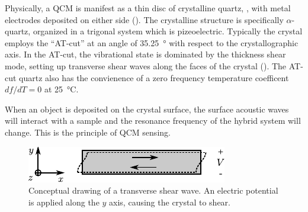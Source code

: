 Physically, a QCM is manifest as a thin disc of crystalline quartz,
, with metal electrodes deposited on either side
().  The crystalline structure is specifically
$\alpha$-quartz, organized in a trigonal system which is pizeoelectric.
Typically the crystal employs the ``AT-cut'' at an angle of
\SI{35.25}{\degree} with respect to the crystallographic axis.  In the
AT-cut, the vibrational state is dominated by the thickness shear mode,
setting up transverse shear waves along the faces of the crystal
().  The AT-cut quartz also has the convienence of
a zero frequency temperature coefficent $df/dT=0$ at \SI{25}{\celsius}.

When an object is deposited on the crystal surface, the surface acoustic
waves will interact with a sample and the resonance frequency of the hybrid
system will change.  This is the principle of QCM sensing.
\begin{figure}[t]
 \centering
 	\includegraphics[keepaspectratio]{qcm/figures/qcm_shearmode.pdf}
	\caption{Conceptual drawing of a transverse shear wave.  An electric
	potential is applied along the $y$ axis, causing the crystal to
	shear.}
 \label{fig:qcmshearwave}
\end{figure}
